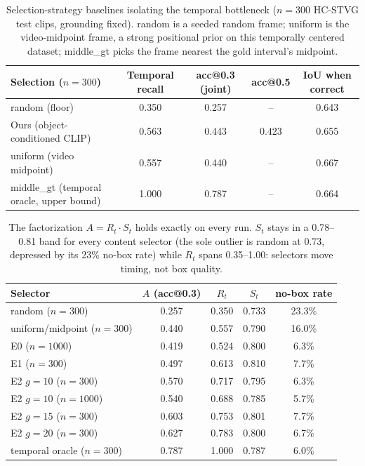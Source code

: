 \documentclass[10pt]{article}
\begin{document}
\begin{table}[htbp]
\centering
\small
\begin{tabular}{lcccc}
\toprule
Selection ($n=300$) & Temporal recall & acc@0.3 (joint) & acc@0.5 & IoU when correct \\
\midrule
random (floor) & 0.350 & 0.257 & -- & 0.643 \\
Ours (object-conditioned CLIP) & 0.563 & 0.443 & 0.423 & 0.655 \\
uniform (video midpoint) & 0.557 & 0.440 & -- & 0.667 \\
middle\_gt (temporal oracle, upper bound) & 1.000 & 0.787 & -- & 0.664 \\
\bottomrule
\end{tabular}
\caption{Selection-strategy baselines isolating the temporal bottleneck ($n=300$ HC-STVG test clips, grounding fixed). random is a seeded random frame; uniform is the video-midpoint frame, a strong positional prior on this temporally centered dataset; middle\_gt picks the frame nearest the gold interval's midpoint.}
\label{tab:selbase}
\end{table}

\begin{table}[htbp]
\centering
\small
\begin{tabular}{lcccc}
\toprule
Selector & $A$ (acc@0.3) & $R_t$ & $S_t$ & no-box rate \\
\midrule
random ($n=300$) & 0.257 & 0.350 & 0.733 & 23.3\% \\
uniform/midpoint ($n=300$) & 0.440 & 0.557 & 0.790 & 16.0\% \\
E0 ($n=1000$) & 0.419 & 0.524 & 0.800 & 6.3\% \\
E1 ($n=300$) & 0.497 & 0.613 & 0.810 & 7.7\% \\
E2 $g=10$ ($n=300$) & 0.570 & 0.717 & 0.795 & 6.3\% \\
E2 $g=10$ ($n=1000$) & 0.540 & 0.688 & 0.785 & 5.7\% \\
E2 $g=15$ ($n=300$) & 0.603 & 0.753 & 0.801 & 7.7\% \\
E2 $g=20$ ($n=300$) & 0.627 & 0.783 & 0.800 & 6.7\% \\
temporal oracle ($n=300$) & 0.787 & 1.000 & 0.787 & 6.0\% \\
\bottomrule
\end{tabular}
\caption{The factorization $A = R_t \cdot S_t$ holds exactly on every run. $S_t$ stays in a 0.78--0.81 band for every content selector (the sole outlier is random at 0.73, depressed by its 23\% no-box rate) while $R_t$ spans 0.35--1.00: selectors move timing, not box quality.}
\label{tab:factor}
\end{table}
\end{document}
